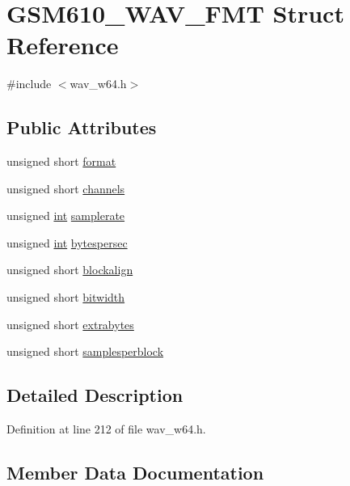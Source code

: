\hypertarget{struct_g_s_m610___w_a_v___f_m_t}{}\section{G\+S\+M610\+\_\+\+W\+A\+V\+\_\+\+F\+MT Struct Reference}
\label{struct_g_s_m610___w_a_v___f_m_t}


{\ttfamily \#include $<$wav\+\_\+w64.\+h$>$}

\subsection*{Public Attributes}
\begin{DoxyCompactItemize}
\item 
unsigned short \hyperlink{struct_g_s_m610___w_a_v___f_m_t_a39a13b66afc014f1660c87288139d32c}{format}
\item 
unsigned short \hyperlink{struct_g_s_m610___w_a_v___f_m_t_a66d6f77e9f228e4769162b2de69c8b96}{channels}
\item 
unsigned \hyperlink{xmltok_8h_a5a0d4a5641ce434f1d23533f2b2e6653}{int} \hyperlink{struct_g_s_m610___w_a_v___f_m_t_ac960a679e75e2e7c41d7d72681b96b81}{samplerate}
\item 
unsigned \hyperlink{xmltok_8h_a5a0d4a5641ce434f1d23533f2b2e6653}{int} \hyperlink{struct_g_s_m610___w_a_v___f_m_t_a6264b5e791da1f5abc1948925601dacf}{bytespersec}
\item 
unsigned short \hyperlink{struct_g_s_m610___w_a_v___f_m_t_a1f84cf7bde5e0d1e1504e5c3358e6223}{blockalign}
\item 
unsigned short \hyperlink{struct_g_s_m610___w_a_v___f_m_t_a6a5b7355cb327bceb02ae311a12070a2}{bitwidth}
\item 
unsigned short \hyperlink{struct_g_s_m610___w_a_v___f_m_t_ab22852020d7b6d48dcbe044dff1dfc38}{extrabytes}
\item 
unsigned short \hyperlink{struct_g_s_m610___w_a_v___f_m_t_aaabdb5940b3caf845d724b86eca2dee9}{samplesperblock}
\end{DoxyCompactItemize}


\subsection{Detailed Description}


Definition at line 212 of file wav\+\_\+w64.\+h.



\subsection{Member Data Documentation}
